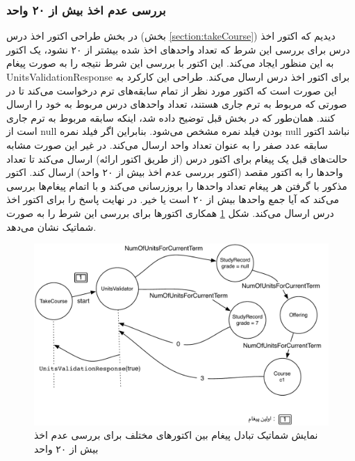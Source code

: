 \FloatBarrier
\subsubsection{بررسی عدم اخذ بیش از ۲۰ واحد}
در بخش طراحی اکتور اخذ درس (بخش \ref{section:takeCourse}) دیدیم که اکتور اخذ درس برای بررسی این شرط که تعداد واحدهای اخذ شده بیشتر از ۲۰ نشود، یک اکتور به این منظور ایجاد می‌کند. این اکتور با بررسی این شرط نتیجه را به صورت پیغام UnitsValidationResponse برای اکتور اخذ درس ارسال می‌کند. طراحی این کارکرد به این صورت است که اکتور مورد نظر از تمام سابقه‌های ترم درخواست می‌کند تا در صورتی که مربوط به ترم جاری هستند، تعداد واحدهای درس مربوط به خود را ارسال کنند. همان‌طور که در بخش قبل توضیح داده شد، اینکه سابقه مربوط به ترم جاری است از null بودن فیلد نمره مشخص می‌شود. بنابراین اگر فیلد نمره null نباشد اکتور سابقه عدد صفر را به عنوان تعداد واحد ارسال می‌کند. در غیر این صورت مشابه‌ حالت‌های قبل یک پیغام برای اکتور درس (از طریق اکتور ارائه) ارسال می‌کند تا تعداد واحدها را به اکتور مقصد (اکتور بررسی عدم اخذ بیش از ۲۰ واحد) ارسال کند. اکتور مذکور با گرفتن هر پیغام تعداد واحدها را بروزرسانی می‌کند و با اتمام پیغام‌ها بررسی می‌کند که آیا جمع واحدها بیش از ۲۰ است یا خیر. در نهایت پاسخ را برای اکتور اخذ درس ارسال می‌کند. شکل \ref{fig:take_course_units} همکاری اکتورها برای بررسی این  شرط را به صورت شماتیک نشان می‌دهد.

\begin{figure}
    \begin{center}
	\includegraphics[width=14cm]{4-ProposedFramework/Figures/NumOfUnits.pdf}
    \end{center}
    \caption{\label{fig:take_course_units}نمایش شماتیک تبادل پیغام بین اکتورهای مختلف برای بررسی عدم اخذ بیش از ۲۰ واحد}
\end{figure}


